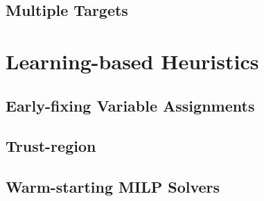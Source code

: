 \subsection{Multiple Targets}

\section{Learning-based Heuristics}\label{sec:learning-based-heuristics}

\subsection{Early-fixing Variable Assignments}

\subsection{Trust-region}

\subsection{Warm-starting MILP Solvers}

